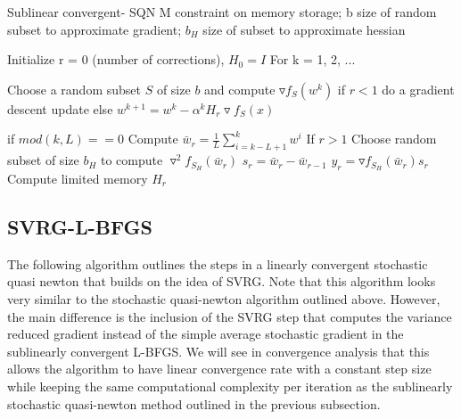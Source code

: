 \documentclass[journal,onecolumn]{IEEEtran}
\newlength\myindent
\newcommand\bindent{%
	\begingroup
	\setlength{\itemindent}{\myindent}
	\addtolength{\algorithmicindent}{\myindent}
}
\newcommand\eindent{\endgroup}
\begin{document}
\begin{algorithm}[H]
	\caption{Sublinear convergent- SQN
		M constraint on memory storage; 
		b size of random subset to approximate gradient;
		$b_H$ size of subset to approximate hessian}
	\begin{algorithmic}
		\STATE Initialize r = 0 (number of corrections), $ H_0 = I $
		\STATE For k = 1, 2, ...
		\bindent
		\STATE Choose a random subset $ S $ of size $ b $ and compute $ \triangledown f_S(w^k) $
		\STATE if $ r < 1 $ do a gradient descent update
		\STATE else 
		\STATE \hspace{2em}$ w^{k+1} = w^k - \alpha^k H_r \triangledown f_S(x) $
		
		\STATE if $ mod(k, L) == 0 $
		\STATE \hspace{2em} Compute $ \bar{w}_r = \frac{1}{L}\sum_{i=k-L+1}^{k} w^i $
		\STATE \hspace{2em} If $ r > 1 $
		\STATE \hspace{4em} Choose random subset of size $ b_H $ to compute $ \triangledown^2 f_{S_H}(\bar{w}_r)$
		\STATE \hspace{4em} $ s_r = \bar{w}_r - \bar{w}_{r-1} $
		\STATE \hspace{4em} $ y_r = \triangledown f_{S_H}(\bar{w}_r) s_r $
		\STATE \hspace{4em} Compute limited memory $ H_r $ 
		\eindent
	\end{algorithmic}
\end{algorithm}

\subsection{SVRG-L-BFGS}
The following algorithm outlines the steps in a linearly convergent stochastic quasi newton that builds on the idea of SVRG. Note that this algorithm looks very similar to the stochastic quasi-newton algorithm outlined above. However, the main difference is the inclusion of the SVRG step that computes the variance reduced gradient instead of the simple average stochastic gradient in the sublinearly convergent L-BFGS. We will see in convergence analysis that this allows the algorithm to have linear convergence rate with a constant step size while keeping the same computational complexity per iteration as the sublinearly stochastic quasi-newton method outlined in the previous subsection.
\end{document}
